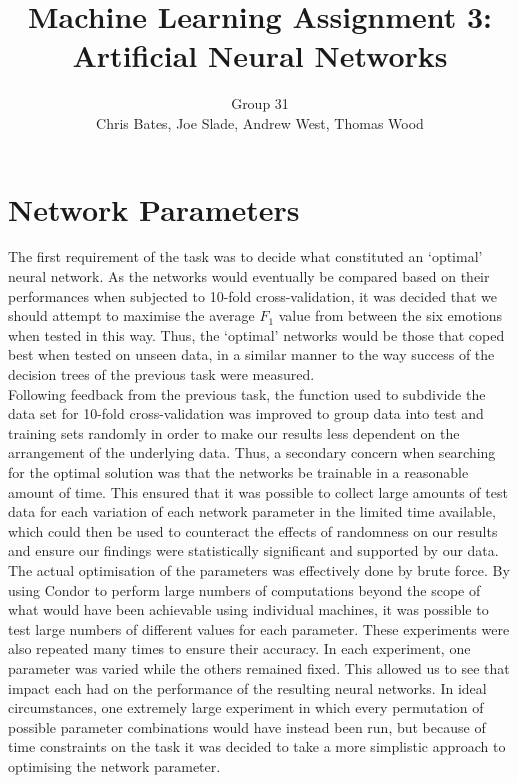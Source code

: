 \documentclass[a4paper]{article}
\title{Machine Learning Assignment 3: Artificial Neural Networks}
\author{Group 31 \\ Chris Bates, Joe Slade, Andrew West, Thomas Wood}
\begin{document}
\maketitle
\section{Network Parameters}


The first requirement of the task was to decide what constituted an `optimal' neural network. As the networks would eventually
be compared based on their performances when subjected to 10-fold cross-validation, it was decided that we should attempt to 
maximise the average $F_1$ value from between the six emotions when tested in this way. Thus, the `optimal' networks would be those that coped
best when tested on unseen data, in a similar manner to the way success of the decision trees of the previous task were measured.\\

Following feedback from the previous task, the function used to subdivide the data set for 10-fold cross-validation was improved
to group data into test and training sets randomly in order to make our results less dependent on the arrangement of the underlying data.
Thus, a secondary concern when searching for the optimal solution was that the networks be trainable in a reasonable amount of time.
This ensured that it was possible to collect large amounts of test data for each variation of each network parameter in the
limited time available, which could then be used to counteract the effects of randomness on our results and ensure our findings
were statistically significant and supported by our data.\\

The actual optimisation of the parameters was effectively done by brute force. By using Condor to perform large numbers of computations
beyond the scope of what would have been achievable using individual machines, it was possible to test large numbers of different values
for each parameter. These experiments were also repeated many times to ensure their accuracy. In each experiment, one parameter was varied
while the others remained fixed. This allowed us to see that impact each had on the performance of the resulting neural networks. In ideal
circumstances, one extremely large experiment in which every permutation of possible parameter combinations would have instead been run,
but because of time constraints on the task it was decided to take a more simplistic approach to optimising the network parameter.\\
\end{document}
